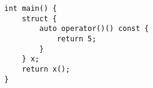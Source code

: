 \begin{lstlisting}[title=\href{https://godbolt.org/z/R8qx3Q}{\texttt{godbolt.org/z/R8qx3Q}}]
int main() {
    struct {
        auto operator()() const {
            return 5;
        }
    } x;
    return x();
}
\end{lstlisting}

